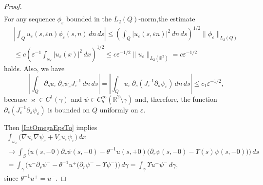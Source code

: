 \documentclass[reqno]{amsart}
\theoremstyle{plain}
\numberwithin{equation}{section}
\renewcommand{\kappa}{\varkappa}
\newcommand{\Real}{\mathbb R}
\newcommand{\eps}{\varepsilon}
\renewcommand{\leq}{\leqslant}
\begin{document}
\begin{proof}
\begin{multline}
  \end{multline}
For any sequence $\phi_\eps$ bounded in the $L_2(Q)$-norm,the estimate
\begin{multline*}
  \left|\int_Q u_\eps(s,\eps n) \phi_\eps(s,n) \,dn\,ds\right|\leq
  \left(\int_Q |u_\eps(s,\eps n)|^2\,dn\,ds\right)^{1/2}\|\phi_\eps\|_{L_2(Q)}
  \\
  \leq c\left(\eps^{-1}\int_{\omega_\eps} |u_\eps(x)|^2\,dx\right)^{1/2}
  \leq c\eps^{-1/2}\|u_\eps\|_{L_2(\Real^2)}
  =c\eps^{-1/2}
\end{multline*}
holds. Also, we have
\begin{equation*}
 \left| \int_Q \partial_s u_\eps \,\partial_s \psi_\eps J_\eps^{-1} \,dn\,ds\right|=\left| \int_Q u_\eps \,\partial_s(J_\eps^{-1}\partial_s\psi_\eps ) \,dn\,ds\right|\leq c_1\eps^{-1/2},
\end{equation*}
because $\kappa \in C^1(\gamma)$ and $\psi\in C^\infty_b(\Real^2\setminus \gamma)$ and, therefore, the function $\partial_s(J_\eps^{-1}\partial_s\psi_\eps )$ is bounded on $Q$ uniformly on $\eps$.

Then \eqref{IntOmegaEpsTo} implies
\begin{multline*}
     \int_{\omega_\eps}\big(\nabla u_\eps \nabla \psi_\eps+  V_\eps u_\eps \psi_\eps\big)\,dx
     \\
     \to \int_S \Big(u(s,-0)\partial_r \psi(s,-0)-
    \theta^{-1}u(s,+0)\big(\partial_r\psi(s,-0)
    -\Upsilon(s)\psi(s,-0)\big)\Big)\,ds
     \\
     =\int_\gamma \Big(u^-\partial_r \psi^--
    \theta^{-1}u^+\big(\partial_r\psi^-
    -\Upsilon\psi^-\big)\Big)\,d\gamma=\int_\gamma\Upsilon u^-\psi^-\,d\gamma,
 \end{multline*}
since $\theta^{-1}u^+ = u^-$.
\end{proof}
\end{document}
